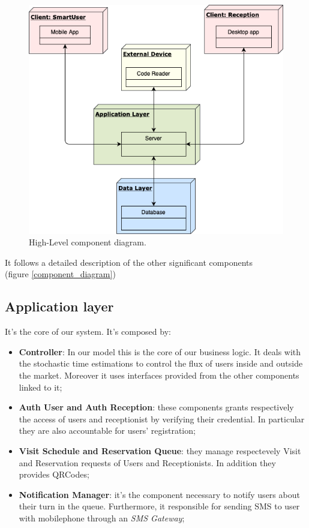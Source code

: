 \begin{figure}[H]
  \centering
  \includegraphics[scale=0.48]{diagrams/h_level.png}
  \caption{High-Level component diagram.}
    \label{fig:highlevel}

\end{figure}



It follows a detailed description of the other significant components \\
(figure \ref{component_diagram})

\pagebreak
\subsection{Application layer}
It's the core of our system. It's composed by:
\begin{itemize}
\item \textbf{Controller}: In our model this is the core of our business logic. It deals with the stochastic time estimations to control the flux of users inside and outside the market. Moreover it uses interfaces provided from the other components linked to it;
\item \textbf{Auth User and Auth Reception}: these components grants respectively the access of users and receptionist by verifying their credential. In particular they are also accountable for users' registration;
\item \textbf{Visit Schedule and Reservation Queue}: they manage respectevely Visit and Reservation requests of Users and Receptionists. In addition they provides QRCodes;
\item \textbf{Notification Manager}: it's the component necessary to notify users about their turn in the queue. Furthermore, it responsible for sending SMS to user with mobilephone through an \textit{SMS Gateway};
\end{itemize}


